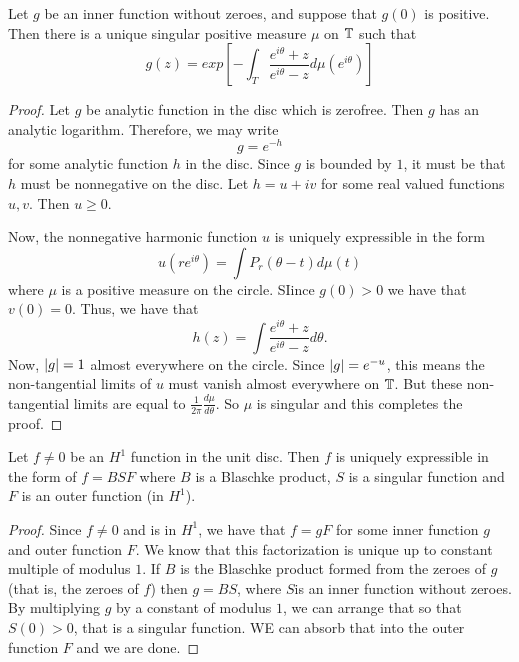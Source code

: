\begin{theorem}
    Let $g$ be an inner function without zeroes, and suppose that $g(0)$ is positive. Then there is a unique singular positive measure $\mu$ on $\mathbb T$ such that
    \begin{equation*}
	g(z)= exp \left[ - \int_{T} \frac{e^{i\theta} + z}{e^{i\theta} - z} d\mu \left( e^{i\theta} \right) \right]
    \end{equation*}
    \label{thm:factoring-inner-function}
\end{theorem}
\begin{proof}
    Let $g$ be analytic function in the disc which is zerofree. Then $g$ has an analytic logarithm. Therefore, we may write 
    \begin{equation*}
	g= e^{-h}
    \end{equation*}
    for some analytic function $h$ in the disc. Since $g$ is bounded by $1$, it must be that $h$ must be nonnegative on the disc. Let $h=u+iv$ for some real valued functions $u,v$. Then $u\ge 0$.

    Now, the nonnegative harmonic function $u$ is uniquely expressible in the form
    \begin{equation*}
	u\left( re^{i\theta} \right) = \int P_{r} \left( \theta-t \right) d\mu \left( t \right)
    \end{equation*}
    where $\mu$ is a positive measure on the circle. SIince $g\left( 0 \right) > 0$ we  have that $v\left( 0 \right) = 0$. Thus, we have that 
    \begin{equation*}
	h\left( z \right) = \int \frac{e^{i\theta}+z}{e^{i\theta}-z} d\theta.
    \end{equation*}
    Now, $\left\lvert g \right\rvert=1$ almost everywhere on the circle. Since $\left\lvert g \right\rvert=e^{-u}$, this means the non-tangential limits of $u$ must vanish almost everywhere on $\mathbb T$. But these non-tangential limits are equal to $\frac{1}{2\pi} \frac{d\mu}{d\theta}$. So $\mu$ is singular and this completes the proof.
\end{proof}

\begin{theorem}
    Let $f \ne 0$ be an $H^{1}$ function in the unit disc. Then $f$ is uniquely expressible in the form of $f=BSF$ where $B$ is a Blaschke product, $S$ is a singular function and $F$ is an outer function (in $H^{1}$).
    \label{thm:BSF}
\end{theorem}
\begin{proof}
    Since $f \ne 0$ and is in $H^{1}$, we have that $f=gF$ for some inner function $g$ and outer function $F$. We know that this factorization is unique up to constant multiple of modulus $1$. If $B$ is the Blaschke product formed from the zeroes of $g$ (that is, the zeroes of $f$) then $g=BS$, where $S$is an inner function without zeroes. By multiplying $g$ by a constant of modulus $1$, we can arrange that so that $S\left( 0 \right) > 0$, that is a singular function. WE can absorb that into the outer function $F$ and we are done.
\end{proof}


